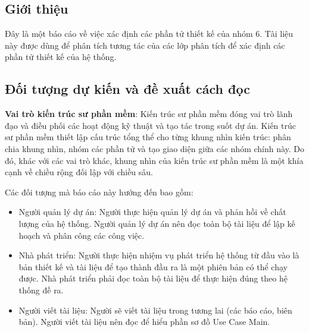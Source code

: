 \documentclass[./../main_file.tex]{subfiles}
\begin{document}
\subsection{Giới thiệu}

Đây là một báo cáo về việc xác định các phần tử thiết kế của nhóm 6.
Tài liệu này được dùng để phân tích tương tác của các lớp phân tích để xác định các phần tử thiết kế của hệ thống.

\subsection{Đối tượng dự kiến và đề xuất cách đọc}

\textbf{Vai trò kiến trúc sư phần mềm}: Kiến trúc sư phần mềm đóng vai trò lãnh đạo và điều phối các hoạt động kỹ thuật và tạo tác trong suốt dự án. Kiến trúc sư phần mềm thiết lập cấu trúc tổng thể cho từng khung nhìn kiến trúc: phân chia khung nhìn, nhóm các phần tử và tạo giao diện giữa các nhóm chính này. Do đó, khác với các vai trò khác, khung nhìn của kiến trúc sư phần mềm là một khía cạnh về chiều rộng đối lập với chiều sâu.

Các đối tượng mà báo cáo này hướng đến bao gồm:
\begin{itemize}
	\item Người quản lý dự án: Người thực hiện quản lý dự án và phản hồi về chất lượng của hệ thống. Người quản lý dự án nên đọc toàn bộ tài liệu để lập kế hoạch và phân công các công việc.
	\item Nhà phát triển: Người thực hiện nhiệm vụ phát triển hệ thống từ đầu vào là bản thiết kế và tài liệu để tạo thành đầu ra là một phiên bản có thể chạy được. Nhà phát triển phải đọc toàn bộ tài liệu để thực hiện đúng theo hệ thống đề ra.
	\item Người viết tài liệu: Người sẽ viết tài liệu trong tương lai (các báo cáo, biên bản). Người viết tài liệu nên đọc để hiểu phần sơ đồ Use Case Main.
\end{itemize}
\end{document}
